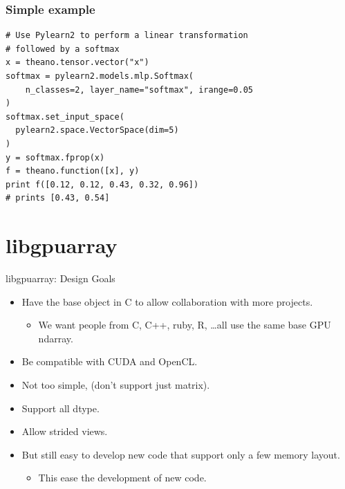 \documentclass[utf8x,xcolor=pdftex,dvipsnames,table]{beamer}
\begin{document}
\begin{frame}[fragile]
  \frametitle{Simple example}

\begin{lstlisting}
# Use Pylearn2 to perform a linear transformation
# followed by a softmax
x = theano.tensor.vector("x")
softmax = pylearn2.models.mlp.Softmax(
    n_classes=2, layer_name="softmax", irange=0.05
)
softmax.set_input_space(
  pylearn2.space.VectorSpace(dim=5)
)
y = softmax.fprop(x)
f = theano.function([x], y)
print f([0.12, 0.12, 0.43, 0.32, 0.96])
# prints [0.43, 0.54]
\end{lstlisting}
\end{frame}

\section{libgpuarray}
\begin{frame}
  \tableofcontents[currentsection]
\end{frame}

\begin{frame}{libgpuarray: Design Goals}
  \begin{itemize}
  \item Have the base object in C to allow collaboration with more projects.
    \begin{itemize}
    \item We want people from C, C++, ruby, R, \ldots all use the same base GPU ndarray.
    \end{itemize}
  \item Be compatible with CUDA and OpenCL.
  \item Not too simple, (don’t support just matrix).
  \item Support all dtype.
  \item Allow strided views.
  \item But still easy to develop new code that support only a few memory layout.
    \begin{itemize}
    \item This ease the development of new code.
    \end{itemize}
  \end{itemize}
\end{frame}
\end{document}
